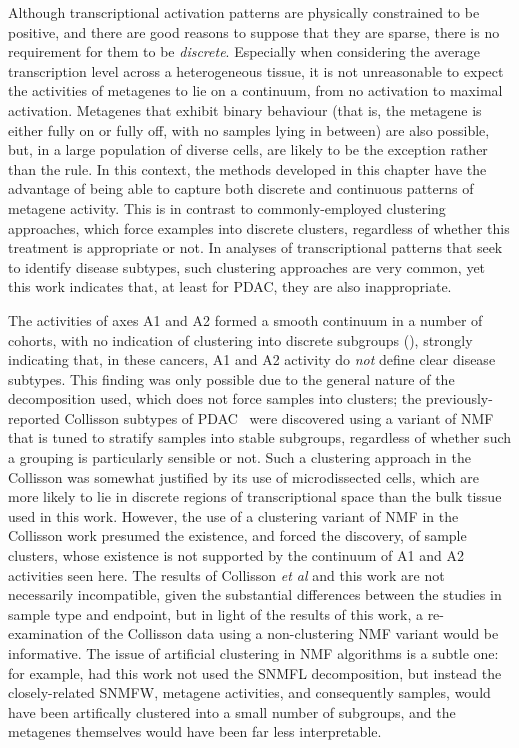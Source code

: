 \documentclass[dissertation.tex]{subfiles}
\begin{document}
Although transcriptional activation patterns are physically constrained to be positive, and there are good reasons to suppose that they are sparse, there is no requirement for them to be \emph{discrete}.  Especially when considering the average transcription level across a heterogeneous tissue, it is not unreasonable to expect the activities of metagenes to lie on a continuum, from no activation to maximal activation.  Metagenes that exhibit binary behaviour (that is, the metagene is either fully on or fully off, with no samples lying in between) are also possible, but, in a large population of diverse cells, are likely to be the exception rather than the rule.  In this context, the methods developed in this chapter have the advantage of being able to capture both discrete and continuous patterns of metagene activity.  This is in contrast to commonly-employed clustering approaches, which force examples into discrete clusters, regardless of whether this treatment is appropriate or not.  In analyses of transcriptional patterns that seek to identify disease subtypes, such clustering approaches are very common, yet this work indicates that, at least for \gls{PDAC}, they are also inappropriate.

The activities of axes A1 and A2 formed a smooth continuum in a number of cohorts, with no indication of clustering into discrete subgroups (), strongly indicating that, in these cancers, A1 and A2 activity do \emph{not} define clear disease subtypes.  This finding was only possible due to the general nature of the decomposition used, which does not force samples into clusters; the previously-reported Collisson subtypes of \gls{PDAC}~\cite{Collisson2011} were discovered using a variant of \gls{NMF} that is tuned to stratify samples into stable subgroups, regardless of whether such a grouping is particularly sensible or not.  Such a clustering approach in the Collisson was somewhat justified by its use of microdissected cells, which are more likely to lie in discrete regions of transcriptional space than the bulk tissue used in this work.  However, the use of a clustering variant of \gls{NMF} in the Collisson work presumed the existence, and forced the discovery, of sample clusters, whose existence is not supported by the continuum of A1 and A2 activities seen here.  The results of Collisson \emph{et al} and this work are not necessarily incompatible, given the substantial differences between the studies in sample type and endpoint, but in light of the results of this work, a re-examination of the Collisson data using a non-clustering \gls{NMF} variant would be informative.  The issue of artificial clustering in \gls{NMF} algorithms is a subtle one: for example, had this work not used the \gls{SNMFL} decomposition, but instead the closely-related \gls{SNMFW}, metagene activities, and consequently samples, would have been artifically clustered into a small number of subgroups, and the metagenes themselves would have been far less interpretable.
\end{document}
